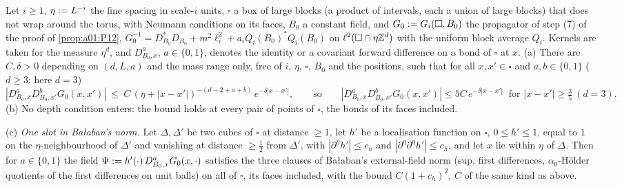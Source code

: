 \begin{lemma}\label{lem:a01:RBK}
Let $i\ge1$, $\eta:= L^{-i}$ the fine spacing in scale-$i$ units, $\square$ a box of large blocks (a product of intervals, each a union of large blocks) that does not wrap around the torus, with Neumann conditions on its faces, $B_0$ a constant field, and $G_0:= G_i(\square,B_0)$ the propagator of step (7) of the proof of \cref{prop:a01:P12}, $G_0^{-1}=D_{B_0}^*D_{B_0}+m^2\ell_i^2+a_iQ_i(B_0)^*Q_i(B_0)$ on $\ell^2(\square\cap\eta\mathbb Z^d)$ with the uniform block average $Q_i$. Kernels are taken for the measure $\eta^d$, and $D^a_{B_0,x}$, $a\in\{0,1\}$, denotes the identity or a covariant forward difference on a bond of $\square$ at $x$. \textup{(a)} There are $C,\delta>0$ depending on $(d,L,a)$ and the mass range only, free of $i$, $\eta$, $\square$, $B_0$ and the positions, such that for all $x,x'\in\square$ and $a,b\in\{0,1\}$ ($d\ge3$; here $d=3$)
\[
|D^a_{B_0,x}D^b_{B_0,x'}G_0(x,x')|\ \le\ C\,(\eta+|x-x'|)^{-(d-2+a+b)}\,e^{-\delta|x-x'|},
\qquad\text{so}\qquad |D^a_{B_0,x}D^b_{B_0,x'}G_0(x,x')|\le5C\,e^{-\delta|x-x'|}\ \text{ for }|x-x'|\ge\tfrac35\ (d=3).
\]
\textup{(b)} No depth condition enters: the bound holds at every pair of points of $\square$, the bonds of its faces included.

\textup{(c)} \emph{One slot in Ba{\l}aban's norm.} Let $\Delta,\Delta'$ be two cubes of $\square$ at distance $\ge1$, let $h'$ be a localisation function on $\square$, $0\le h'\le1$, equal to $1$ on the $\eta$-neighbourhood of $\Delta'$ and vanishing at distance $\ge\frac12$ from $\Delta'$, with $|\partial^\eta h'|\le c_h$ and $|\partial^\eta\partial^\eta h'|\le c_h$, and let $x$ lie within $\eta$ of $\Delta$. Then for $a\in\{0,1\}$ the field $\Psi:= h'(\cdot)\,D^a_{B_0,x}G_0(x,\cdot)$ satisfies the three clauses of Ba{\l}aban's external-field norm \cite[(1.32)]{Ba3} (sup, first differences, $\alpha_0$-H\"older quotients of the first differences on unit balls) on all of $\square$, its faces included, with the bound $C(1+c_h)^2$, $C$ of the same kind as above.
\end{lemma}
